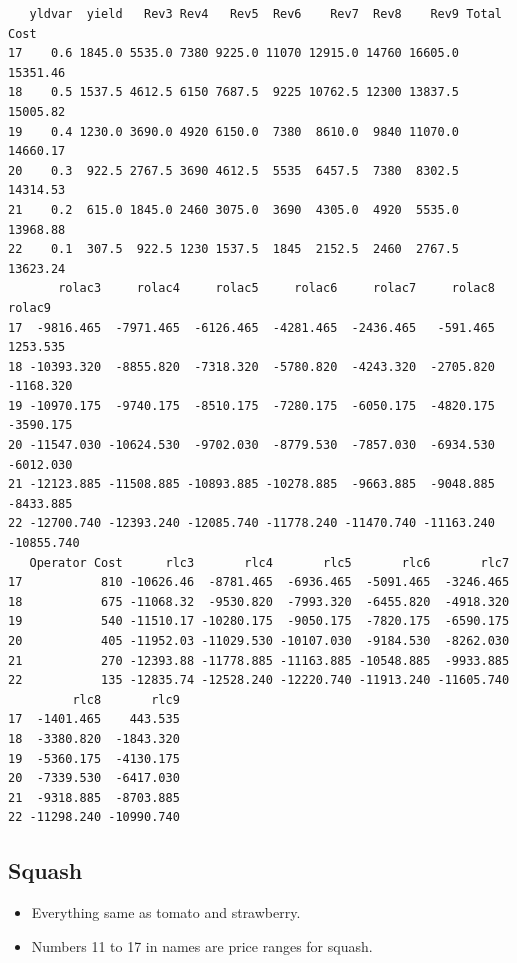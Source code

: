 \documentclass[
  letterpaper,
  DIV=11,
  numbers=noendperiod]{scrartcl}
\begin{document}
\begin{verbatim}
   yldvar  yield   Rev3 Rev4   Rev5  Rev6    Rev7  Rev8    Rev9 Total Cost
17    0.6 1845.0 5535.0 7380 9225.0 11070 12915.0 14760 16605.0   15351.46
18    0.5 1537.5 4612.5 6150 7687.5  9225 10762.5 12300 13837.5   15005.82
19    0.4 1230.0 3690.0 4920 6150.0  7380  8610.0  9840 11070.0   14660.17
20    0.3  922.5 2767.5 3690 4612.5  5535  6457.5  7380  8302.5   14314.53
21    0.2  615.0 1845.0 2460 3075.0  3690  4305.0  4920  5535.0   13968.88
22    0.1  307.5  922.5 1230 1537.5  1845  2152.5  2460  2767.5   13623.24
       rolac3     rolac4     rolac5     rolac6     rolac7     rolac8     rolac9
17  -9816.465  -7971.465  -6126.465  -4281.465  -2436.465   -591.465   1253.535
18 -10393.320  -8855.820  -7318.320  -5780.820  -4243.320  -2705.820  -1168.320
19 -10970.175  -9740.175  -8510.175  -7280.175  -6050.175  -4820.175  -3590.175
20 -11547.030 -10624.530  -9702.030  -8779.530  -7857.030  -6934.530  -6012.030
21 -12123.885 -11508.885 -10893.885 -10278.885  -9663.885  -9048.885  -8433.885
22 -12700.740 -12393.240 -12085.740 -11778.240 -11470.740 -11163.240 -10855.740
   Operator Cost      rlc3       rlc4       rlc5       rlc6       rlc7
17           810 -10626.46  -8781.465  -6936.465  -5091.465  -3246.465
18           675 -11068.32  -9530.820  -7993.320  -6455.820  -4918.320
19           540 -11510.17 -10280.175  -9050.175  -7820.175  -6590.175
20           405 -11952.03 -11029.530 -10107.030  -9184.530  -8262.030
21           270 -12393.88 -11778.885 -11163.885 -10548.885  -9933.885
22           135 -12835.74 -12528.240 -12220.740 -11913.240 -11605.740
         rlc8       rlc9
17  -1401.465    443.535
18  -3380.820  -1843.320
19  -5360.175  -4130.175
20  -7339.530  -6417.030
21  -9318.885  -8703.885
22 -11298.240 -10990.740
\end{verbatim}

\subsection{Squash}\label{squash}

\begin{itemize}
\item
  Everything same as tomato and strawberry.
\item
  Numbers 11 to 17 in names are price ranges for squash.
\end{itemize}
\end{document}
